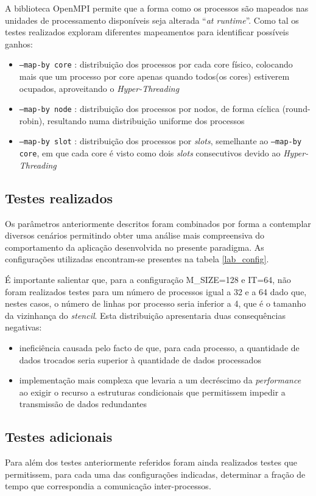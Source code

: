 \documentclass{article}
\begin{document}
A biblioteca OpenMPI permite que a forma como os processos são mapeados nas unidades de processamento 
disponíveis seja alterada ``\textit{at runtime}''. Como tal os testes realizados exploram diferentes
mapeamentos para identificar possíveis ganhos:
\begin{itemize}
    \item \texttt{--map-by core} : distribuição dos processos por cada core físico, colocando mais que um processo por core apenas quando todos(os cores) 
    estiverem ocupados, aproveitando o \textit{Hyper-Threading}
    \item \texttt{--map-by node} : distribuição dos processos por nodos, de forma cíclica (round-robin), resultando numa distribuição uniforme dos
    processos
    \item \texttt{--map-by slot} : distribuição dos processos por \textit{slots}, semelhante ao \texttt{--map-by core}, em que cada core é visto como dois
    \textit{slots} consecutivos devido ao \textit{Hyper-Threading}
\end{itemize}

\subsection{Testes realizados}
Os parâmetros anteriormente descritos foram combinados por forma a contemplar diversos cenários
permitindo obter uma análise mais compreensiva do comportamento da aplicação desenvolvida no
presente paradigma. As configurações utilizadas encontram-se presentes na tabela \ref{lab_config}.

É importante salientar que, para a configuração M\_SIZE=128 e IT=64, não foram realizados testes para 
um número de processos igual a 32 e a 64 dado que, nestes casos, o número de linhas por processo seria 
inferior a 4, que é o tamanho da vizinhança do \textit{stencil}. Esta distribuição apresentaria duas consequências
negativas:
\begin{itemize}
    \item ineficiência causada pelo facto de que, para cada processo, a quantidade de dados trocados seria superior à quantidade de dados processados
    \item implementação mais complexa que levaria a um decréscimo da \textit{performance} ao exigir o recurso a estruturas condicionais que permitissem 
    impedir a transmissão de dados redundantes
\end{itemize}

\subsection{Testes adicionais}
Para além dos testes anteriormente referidos foram ainda realizados testes que permitissem, para cada uma das 
configurações indicadas, determinar a fração de tempo que correspondia a comunicação inter-processos.
\end{document}
